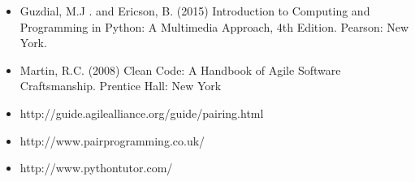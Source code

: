 \documentclass{../fal_assignment}
\begin{document}
\begin{itemize}
    \item Guzdial, M.J . and Ericson, B. (2015) Introduction to Computing and Programming in Python: A Multimedia Approach, 4th Edition. Pearson: New York.
    \item Martin, R.C. (2008) Clean Code: A Handbook of Agile Software Craftsmanship. Prentice Hall: New York
    \item http://guide.agilealliance.org/guide/pairing.html
    \item http://www.pairprogramming.co.uk/
    \item http://www.pythontutor.com/
\end{itemize}

\end{document}
